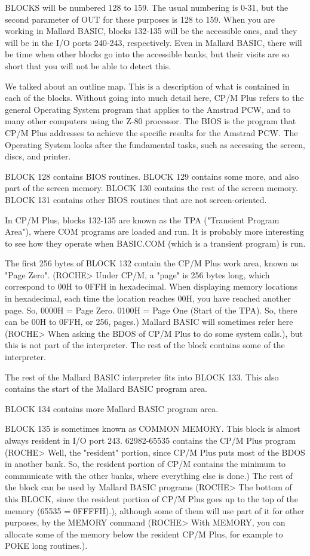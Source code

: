 BLOCKS  will  be  numbered 128 to 159. The usual numbering is  0-31,  but  the 
second parameter of OUT for these purposes is 128 to 159. When you are working 
in Mallard BASIC, blocks 132-135 will be the accessible ones, and they will be 
in  the I/O ports 240-243, respectively. Even in Mallard BASIC, there will  be 
time  when other blocks go into the accessible banks, but their visits are  so 
short that you will not be able to detect this.

We talked about an outline map. This is a description of what is contained  in 
each  of the blocks. Without going into much detail here, CP/M Plus refers  to 
the  general Operating System program that applies to the Amstrad PCW, and  to 
many  other computers using the Z-80 processor. The BIOS is the  program  that 
CP/M  Plus addresses to achieve the specific results for the Amstrad PCW.  The 
Operating  System  looks after the fundamental tasks, such  as  accessing  the 
screen, discs, and printer.

BLOCK 128 contains BIOS routines. BLOCK 129 contains some more, and also  part 
of the screen memory. BLOCK 130 contains the rest of the screen memory.  BLOCK 
131 contains other BIOS routines that are not screen-oriented.

In CP/M Plus, blocks 132-135 are known as the TPA ("Transient Program  Area"), 
where COM programs are loaded and run. It is probably more interesting to  see 
how they operate when BASIC.COM (which is a transient program) is run.

The  first  256 bytes of BLOCK 132 contain the CP/M Plus work area,  known  as 
"Page Zero". (ROCHE> Under CP/M, a "page" is 256 bytes long, which  correspond 
to   00H  to  0FFH  in  hexadecimal.  When  displaying  memory  locations   in 
hexadecimal,  each  time the location reaches 00H, you  have  reached  another 
page.  So, 0000H = Page Zero. 0100H = Page One (Start of the TPA).  So,  there 
can  be 00H to 0FFH, or 256, pages.) Mallard BASIC will sometimes  refer  here 
(ROCHE> When asking the BDOS of CP/M Plus to do some system calls.), but  this 
is  not  part of the interpreter. The rest of the block contains some  of  the 
interpreter.

The  rest  of  the Mallard BASIC interpreter fits into BLOCK  133.  This  also 
contains the start of the Mallard BASIC program area.

BLOCK 134 contains more Mallard BASIC program area.

BLOCK  135  is sometimes known as COMMON MEMORY. This block is  almost  always 
resident  in I/O port 243. 62982-65535 contains the CP/M Plus program  (ROCHE> 
Well, the "resident" portion, since CP/M Plus puts most of the BDOS in another 
bank.  So,  the resident portion of CP/M contains the minimum  to  communicate 
with  the other banks, where everything else is done.) The rest of  the  block 
can be used by Mallard BASIC programs (ROCHE> The bottom of this BLOCK,  since 
the  resident portion of CP/M Plus goes up to the top of the memory  (65535  = 
0FFFFH).),  although some of them will use part of it for other  purposes,  by 
the  MEMORY command (ROCHE> With MEMORY, you can allocate some of  the  memory 
below the resident CP/M Plus, for example to POKE long routines.).


